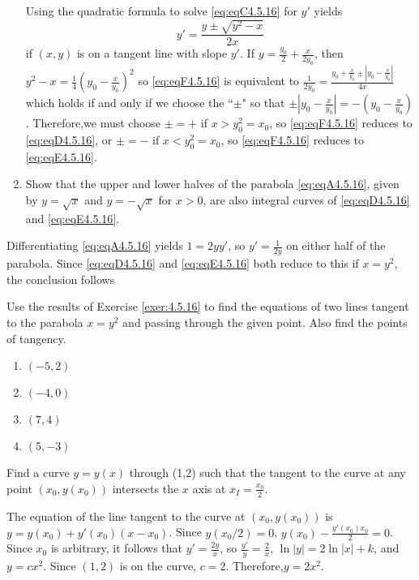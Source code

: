 \documentclass{ximera}
\begin{document}
\begin{problem}
\begin{enumerate}
\begin{solution}
Using the quadratic formula to solve \ref{eq:eqC4.5.16} for $y'$ yields
\begin{equation}\label{eq:eqF4.5.16}
y'=\frac{y\pm\sqrt{y^2-x}}{2x}
\end{equation}
if $(x,y)$ is on a tangent line with slope $y'$. If
$y=\frac{y_0}{2}+\frac{x}{2y_0}$, then
$y^2-x=\frac{1}{4}\left(y_0-\frac{x}{y_0}\right)^2$ so \ref{eq:eqF4.5.16} is
equivalent to $\frac{1}{2y_0}= \frac{y_0+\frac{x}{y_0}\pm\left|y_0-\frac{x}{y_0}\right|}{4x}$ which holds if and
only if we choose the ``$\pm$" so that $\pm\left|y_0-\frac{x}{y_0}
\right|=-\left(y_0-\frac{x}{y_0}\right)$. Therefore,we must
choose $\pm=+$ if $x>y_0^2=x_0$, so \ref{eq:eqF4.5.16} reduces to \ref{eq:eqD4.5.16}, or $\pm=-$ if
$x<y_0^2=x_0$, so \ref{eq:eqF4.5.16} reduces to \ref{eq:eqE4.5.16}.

\end{solution}

\item %
Show that the upper and lower halves of the parabola \ref{eq:eqA4.5.16}, given by
$y=\sqrt x$ and $y=-\sqrt x$ for $x>0$, are also integral curves of
\ref{eq:eqD4.5.16} and \ref{eq:eqE4.5.16}.
\end{enumerate}

\begin{solution}
Differentiating \ref{eq:eqA4.5.16} yields $1=2yy'$, so $y'=\frac{1}{2y}$
on either half of the parabola. Since \ref{eq:eqD4.5.16} and \ref{eq:eqE4.5.16} both reduce to this
if $x=y^2$, the conclusion follows
\end{solution}
\end{problem}

\begin{problem}\label{exer:4.5.17}
Use the results of Exercise \ref{exer:4.5.16} to find the equations of two
lines tangent to the parabola $x=y^2$ and passing through the given
point. Also find the points of tangency.

\begin{enumerate}
    \item $(-5,2)$
    \item $(-4,0)$
    \item $(7,4)$
    \item $(5,-3)$
\end{enumerate}
\end{problem}

\begin{problem}\label{exer:4.5.18}
Find a curve $y=y(x)$ through (1,2) such that the tangent to the curve
at any point $(x_0,y(x_0))$ intersects the $x$ axis at
$x_I=\frac{x_0}{2}$.

\begin{solution}
The equation of the line tangent to the curve at $(x_0,y(x_0))$
is $y=y(x_0)+y'(x_0)(x-x_0)$. Since $y(x_0/2)=0$,
$y(x_0)-\frac{y'(x_0)x_0}{2}=0$. Since $x_0$ is arbitrary,
it follows that $y'=\frac{2y}{x}$, so
$\frac{y'}{y}=\frac{2}{x}$, $\ln|y|=2\ln|x|+k$, and
$y=cx^2$. Since $(1,2)$ is on the curve, $c=2$. Therefore,$y=2x^2$.
\end{solution}
\end{problem}
\end{document}

